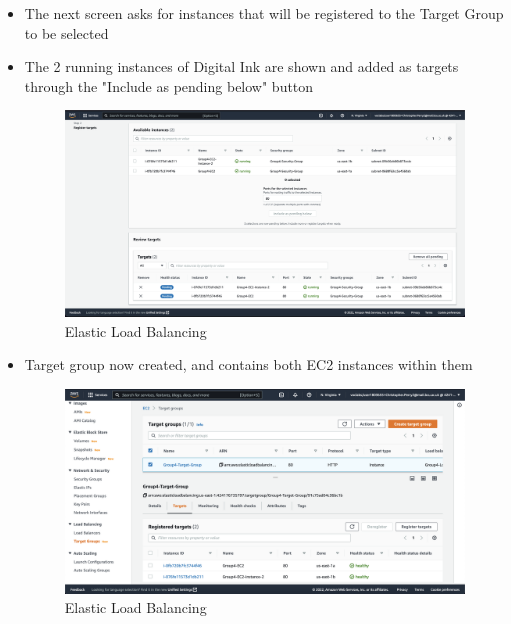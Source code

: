 \begin{itemize}
\begin{figure}[!htbp]
                                  \label{fig:elb-vpc}
    \end{figure}
    \item The next screen asks for instances that will be registered to the Target Group to be selected
    \item The 2 running instances of Digital Ink are shown and added as targets through the "Include as pending below"
    button \begin{figure}[!htbp]
                         \centering
                         \includegraphics[width=\textwidth]{resources/elb/elb-register-targets.png}
                         \caption{Elastic Load Balancing}
                         \label{fig:elb-register-targets}
                \end{figure}
    \item Target group now created, and contains both EC2 instances within them \begin{figure}[!htbp]
                                                                                    \centering
                                                                                    \includegraphics[width=\textwidth]{resources/elb/elb-target-group-created.png}
                                                                                    \caption{Elastic Load Balancing}
                                                                                    \label{fig:elb-target-group-create}
    \end{figure}
\end{itemize}

